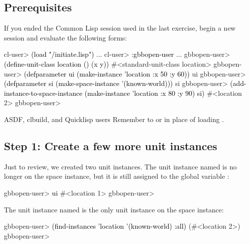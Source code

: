 \documentclass[10pt,twoside,english,pdftex]{article}
\begin{document}
\fndocrule

\subsection*{Prerequisites}

%
%
%
If you ended the Common Lisp session used in the last exercise, begin a new
session and evaluate the following forms:
%
\W\supp
\begin{example}
\textcolor{darkergray}{%
  cl-user> \textcolor{black}{(load "/initiate.lisp")}
     ...
  cl-user> \textcolor{black}{:gbbopen-user}
     ...
  gbbopen-user> \textcolor{black}{(define-unit-class location ()
                   (x y))}
  #<standard-unit-class location>
  gbbopen-user> \textcolor{black}{(defparameter ui (make-instance 'location :x 50 :y 60))}
  ui
  gbbopen-user> \textcolor{black}{(defparameter si (make-space-instance '(known-world)))}
  si
  gbbopen-user> \textcolor{black}{(add-instance-to-space-instance 
                   (make-instance 'location :x 80 :y 90)
                   si)}
  #<location 2>
  gbbopen-user>}
\end{example}

%
%
\begin{notebox}{ASDF, clbuild, and Quicklisp users}
  Remember to  or
   in place of loading
  .
\end{notebox}

\subsection*{Step 1: Create a few more unit instances}

Just to review, we created two  unit instances.  The
unit instance named  is no longer on the 
space instance, but it is still assigned to the global variable :
%
%
\W\supp
\begin{example}
\textcolor{darkergray}{%
  gbbopen-user> \textcolor{black}{ui}
  #<location 1> 
  gbbopen-user>}
\end{example}
%
The  unit instance named  is the only
 unit instance on the  space
instance:
%
%
\W\supp\notpretop
\begin{example}
\textcolor{darkergray}{%
  gbbopen-user> \textcolor{black}{(find-instances 'location '(known-world) :all)}
  (#<location 2>)
  gbbopen-user>}
\end{example}
\end{document}
